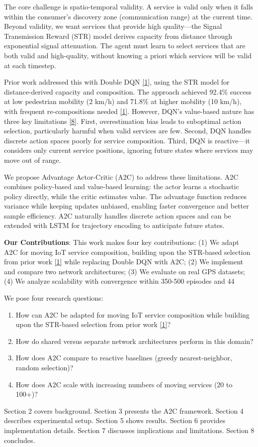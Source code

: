 The core challenge is spatio-temporal validity. A service is valid only
when it falls within the consumer's discovery zone (communication range)
at the current time. Beyond validity, we want services that provide high
quality---the Signal Transmission Reward (STR) model derives capacity
from distance through exponential signal attenuation. The agent must
learn to select services that are both valid and high-quality, without
knowing a priori which services will be valid at each timestep.

Prior work addressed this with Double DQN \hyperlink{cite.neiat2021}{\hyperlink{cite.neiat2021}{[1]}}, using the STR model
for distance-derived capacity and composition. The approach achieved
92.4\% success at low pedestrian mobility (2 km/h) and 71.8\% at higher
mobility (10 km/h), with frequent re-compositions needed \hyperlink{cite.neiat2021}{\hyperlink{cite.neiat2021}{[1]}}. However,
DQN's value-based nature has three key limitations \hyperlink{cite.gai2018}{\hyperlink{cite.gai2018}{[8]}}. First,
overestimation bias leads to suboptimal action selection, particularly
harmful when valid services are few. Second, DQN handles discrete action
spaces poorly for service composition. Third, DQN is reactive---it
considers only current service positions, ignoring future states where
services may move out of range.

We propose Advantage Actor-Critic (A2C) to address these limitations.
A2C combines policy-based and value-based learning: the actor learns a
stochastic policy directly, while the critic estimates value. The
advantage function reduces variance while keeping updates unbiased,
enabling faster convergence and better sample efficiency. A2C naturally
handles discrete action spaces and can be extended with LSTM for
trajectory encoding to anticipate future states.

\textbf{Our Contributions}: This work makes four key contributions: (1) We adapt A2C for moving IoT service composition, building upon the STR-based selection from prior work \hyperlink{cite.neiat2021}{\hyperlink{cite.neiat2021}{[1]}} while replacing Double DQN with A2C; (2) We implement and compare two network architectures; (3) We evaluate on real GPS datasets; (4) We analyze scalability with convergence within 350-500 episodes and 44%

We pose four research questions:

\begin{enumerate}
	\item How can A2C be adapted for moving IoT service composition while
	      building upon the STR-based selection from prior work \hyperlink{cite.neiat2021}{\hyperlink{cite.neiat2021}{[1]}}?
	\item How do shared versus separate network architectures perform in this
	      domain?
	\item How does A2C compare to reactive baselines (greedy nearest-neighbor,
	      random selection)?
	\item How does A2C scale with increasing numbers of moving services (20 to
	      100+)?
\end{enumerate}

Section 2 covers background. Section 3 presents the A2C framework.
Section 4 describes experimental setup. Section 5 shows results. Section
6 provides implementation details. Section 7 discusses implications and
limitations. Section 8 concludes.
